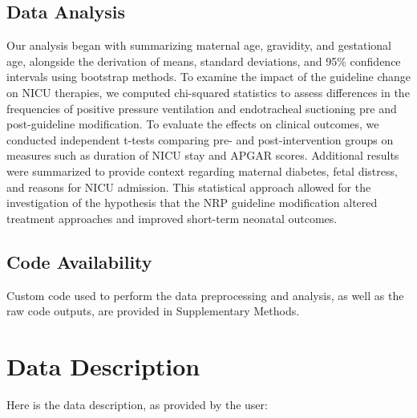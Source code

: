 \documentclass[11pt]{article}
\begin{document}
\subsection*{Data Analysis}
Our analysis began with summarizing maternal age, gravidity, and gestational age, alongside the derivation of means, standard deviations, and 95\% confidence intervals using bootstrap methods. To examine the impact of the guideline change on NICU therapies, we computed chi-squared statistics to assess differences in the frequencies of positive pressure ventilation and endotracheal suctioning pre and post-guideline modification. To evaluate the effects on clinical outcomes, we conducted independent t-tests comparing pre- and post-intervention groups on measures such as duration of NICU stay and APGAR scores. Additional results were summarized to provide context regarding maternal diabetes, fetal distress, and reasons for NICU admission. This statistical approach allowed for the investigation of the hypothesis that the NRP guideline modification altered treatment approaches and improved short-term neonatal outcomes.\subsection*{Code Availability}

Custom code used to perform the data preprocessing and analysis, as well as the raw code outputs, are provided in Supplementary Methods.






\clearpage
\appendix

\section{Data Description} \label{sec:data_description} Here is the data description, as provided by the user:
\end{document}
